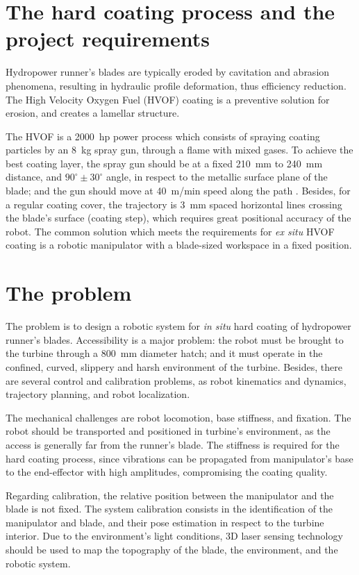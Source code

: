 \section{The hard coating process and the project requirements}\label{hvof}

Hydropower runner's blades are typically eroded by cavitation and abrasion
phenomena, resulting in hydraulic profile deformation, thus efficiency
reduction. The High Velocity Oxygen Fuel (HVOF) coating is a preventive
solution for erosion, and creates a lamellar structure. 

The HVOF is a 2000~hp power process which consists of spraying coating particles
by an 8~kg spray gun, through a flame with mixed gases. To achieve the best
coating layer, the spray gun should be at a fixed 210~mm to 240~mm distance, and
$90^\circ \pm 30^\circ$ angle, in respect to the metallic surface plane of the
blade; and the gun should move at 40~m/min speed along the path
\cite{li2002effect}.  Besides, for a regular coating cover, the trajectory is
3~mm spaced horizontal lines crossing the blade's surface (coating step), which
requires great positional accuracy of the robot.
The common solution which meets the requirements for \textit{ex situ} HVOF
coating is a robotic manipulator with a blade-sized workspace in a fixed
position.

\section{The problem}\label{problem}

The problem is to design a robotic system for \textit{in situ} hard coating of
hydropower runner's blades. Accessibility is a major problem: the robot must be
brought to the turbine through a 800~mm diameter hatch; and it must operate in
the confined, curved, slippery and harsh environment of the turbine. Besides, there are
several control and calibration problems, as robot kinematics and
dynamics, trajectory planning, and robot localization.

The mechanical challenges are robot locomotion, base stiffness, and fixation.
The robot should be transported and positioned in turbine's environment, as the
access is generally far from the runner's blade.
The stiffness is required for the hard coating process, since vibrations can be
propagated from manipulator's base to the end-effector with high
amplitudes, compromising the coating quality.

Regarding calibration, the relative position between the manipulator and the
blade is not fixed. The system calibration consists in the identification of
the manipulator and blade, and their pose estimation in respect to the turbine
interior. Due to the environment's light conditions, 3D laser sensing
technology should be used to map the topography of the blade, the
environment, and the robotic system. 

